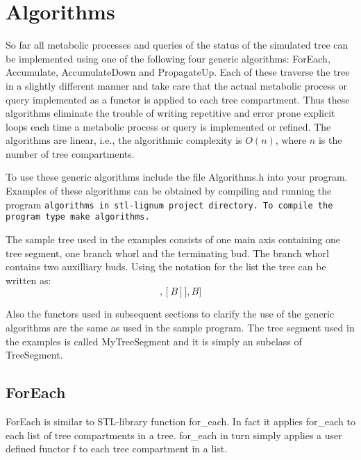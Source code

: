 \chapter{Algorithms}

So  far all   metabolic processes and   queries  of the  status of the
simulated  tree can be  implemented using  one  of the following  four
generic    algorithms:   ForEach,  Accumulate,   AccumulateDown    and
PropagateUp.  Each of these traverse the tree  in a slightly different
manner  and take   care that  the actual   metabolic process or  query
implemented  as a functor  is applied to  each tree compartment.  Thus
these algorithms eliminate the trouble of writing repetitive and error
prone explicit loops  each time    a  metabolic process or query    is
implemented  or refined.      The algorithms are    linear,  i.e., the
algorithmic  complexity is $O(n)$, where  $n$   is the number of  tree
compartments.

To   use these generic  algorithms  include the file Algorithms.h into
your   program.   Examples of these   algorithms   can be  obtained by
compiling  and running  the  program \tt algorithms  \rm in stl-lignum
project   directory.   To    compile    the program type    \tt   make
algorithms\rm.

The sample  tree  used in  the   examples consists  of one  main  axis
containing one tree segment, one branch whorl and the terminating bud.
The branch whorl contains two  auxilliary buds. Using the notation for
the list the tree can be written as:
\begin{displaymath}
[TS,[[B],[B]],B] 
\end{displaymath}

Also the  functors used in subsequent  sections to clarify  the use of
the generic algorithms are the same as used in the sample program. The
tree segment  used in the examples  is called MyTreeSegment  and it is
simply an subclass of TreeSegment.
 
\section{ForEach}

ForEach is similar to  STL-library  function  for\_each.  In fact   it
applies  for\_each to  each  list  of  tree  compartments  in a  tree.
for\_each in turn simply applies a user defined functor f to each tree
compartment in a list.

